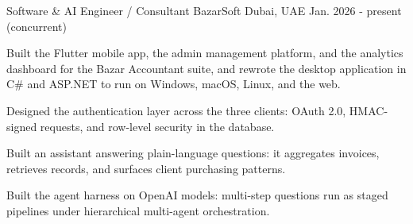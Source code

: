 \begin{cventries}
  \cventry
    {Software \& AI Engineer / Consultant} %
    {BazarSoft} %
    {Dubai, UAE} %
    {Jan. 2026 - present (concurrent)} %
    {
      \begin{cvitems} %
        \item{Built the Flutter mobile app, the admin management platform, and the analytics dashboard for the Bazar Accountant suite, and rewrote the desktop application in C\# and ASP.NET to run on Windows, macOS, Linux, and the web.}
        \item{Designed the authentication layer across the three clients: OAuth 2.0, HMAC-signed requests, and row-level security in the database.}
        \item{Built an assistant answering plain-language questions: it aggregates invoices, retrieves records, and surfaces client purchasing patterns.}
        \item{Built the agent harness on OpenAI models: multi-step questions run as staged pipelines under hierarchical multi-agent orchestration.}
      \end{cvitems}
    }



\end{cventries}

